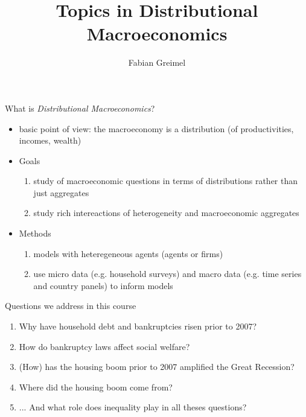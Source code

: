 \documentclass[aspectratio=169,mathserif]{beamer}
\author{Fabian Greimel}
\title{Topics in Distributional Macroeconomics}
\begin{document}
 
\frame[plain]{\maketitle}

\begin{frame}{What is \emph{Distributional Macroeconomics}?}

  \begin{itemize}
  \item basic point of view: the \alert{macroeconomy is a distribution} (of productivities, incomes, wealth)
  \item Goals
    \begin{enumerate}
    \item study of \alert{macroeconomic questions in terms of distributions} rather than just aggregates
      
    \item study \alert{rich intereactions} of heterogeneity and macroeconomic aggregates
    \end{enumerate}
  \item Methods
    \begin{enumerate}
    \item \alert{models with heteregeneous agents} (agents or firms)
    \item use \alert{micro data} (e.g. household surveys) and \alert{macro data} (e.g. time series and country panels) to inform models
    \end{enumerate}
  \end{itemize}
\end{frame}

\begin{frame}{Questions we address in this course}
  \begin{enumerate}
  \item Why have household debt and bankruptcies risen prior to 2007?
  \item How do bankruptcy laws affect social welfare?
  \item (How) has the housing boom prior to 2007 amplified the Great Recession?
  \item Where did the housing boom come from?
  \item ... And what role does inequality play in all theses questions?
  \end{enumerate}
\end{frame}
\end{document}
